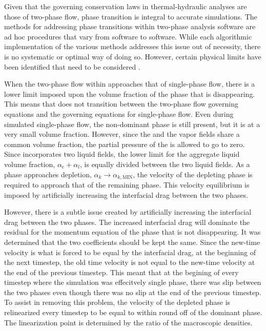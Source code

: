 Given that the governing conservation laws in thermal-hydraulic analyses are those of two-phase flow, phase transition is integral to accurate simulations.
The methods for addressing phase transitions within two-phase analysis software are ad hoc procedures that vary from software to software.
While each algorithmic implementation of the various methods addresses this issue out of necessity, there is no systematic or optimal way of doing so.
However, certain physical limits have been identified that need to be considered \cite{Bestion2000}.

When the two-phase flow within \cobra{} approaches that of single-phase flow, there is a lower limit imposed upon the volume fraction of the phase that is disappearing.
This means that \cobra{} does not transition between the two-phase flow governing equations and the governing equations for single-phase flow.
Even during simulated single-phase flow, the non-dominant phase is still present, but it is at a very small volume fraction.
However, since the \ncgs{} and the vapor fields share a common volume fraction, the partial pressure of the \ncgs{} is allowed to go to zero. 
Since \cobra{} incorporates two liquid fields, the lower limit for the aggregate liquid volume fraction, $\alpha_e + \alpha_l$, is equally divided between the two liquid fields.
As a phase approaches depletion, $\alpha_k \rightarrow \alpha_{k,\text{MIN}}$, the velocity of the depleting phase is required to approach that of the remaining phase.
This velocity equilibrium is imposed by artificially increasing the interfacial drag between the two phases.

However, there is a subtle issue created by artificially increasing the interfacial drag between the two phases.
The increased interfacial drag will dominate the residual for the momentum equation of the phase that is not disappearing.
It was determined that the two coefficients should be kept the same.
Since the new-time velocity is what is forced to be equal by the interfacial drag, at the beginning of the next timestep, the old time velocity is not equal to the new-time velocity at the end of the previous timestep.
This meant that at the begining of every timestep where the simulation was effecitvely single phase, there was slip between the two phases even though there was no slip at the end of the previous timestep.
To assist in removing this problem, the velocity of the depleted phase is relinearized every timestep to be equal to within round off of the dominant phase.
The linearization point is determined by the ratio of the macroscopic densities.
 

